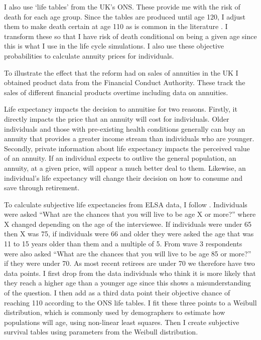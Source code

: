 \documentclass[12pt]{article}
\begin{document}
I also use `life tables' from the UK's ONS. These provide me with the risk of
death for each age group. Since the tables are produced until age 120, I adjust
them to make death certain at age 110 as is common in the literature
\cite{odea_sturrock_rest_2023}. I transform these so that I have risk of death
conditional on being a given age since this is what I use in the life cycle
simulations. I also use these objective probabilities to calculate annuity
prices for individuals.

To illustrate the effect that the reform had on sales of annuities in the UK I
obtained product data from the Financial Conduct Authority. These track the
sales of different financial products overtime including data on annuities.

Life expectancy impacts the decision to annuitise for two reasons. Firstly, it
directly impacts the price that an annuity will cost for individuals. Older
individuals and those with pre-existing health conditions generally can buy an
annuity that provides a greater income stream than individuals who are younger.
Secondly, private information about life expectancy impacts the perceived value
of an annuity. If an individual expects to outlive the general population, an
annuity, at a given price, will appear a much better deal to them. Likewise, an
individual's life expectancy will change their decision on how to consume and
save through retirement.

To calculate subjective life expectancies from ELSA data, I follow
\cite{odea_sturrock_rest_2023}. Individuals were asked “What are the chances
that you will live to be age X or more?” where X changed depending on the age of
the interviewee. If individuals were under 65 then X was 75, if individuals were
66 and older they were asked the age that was 11 to 15 years older than them and
a multiple of 5. From wave 3 respondents were also asked “What are the chances
that you will live to be age 85 or more?” if they were under 70. As most recent
retirees are under 70 we therefore have two data points. I first drop from the
data individuals who think it is more likely that they reach a higher age than a
younger age since this shows a misunderstanding of the question. I then add as a
third data point their objective chance of reaching 110 according to the ONS
life tables. I fit these three points to a Weibull distribution, which is
commonly used by demographers to estimate how populations will age, using
non-linear least squares. Then I create subjective survival tables using
parameters from the Weibull distribution.
\end{document}
